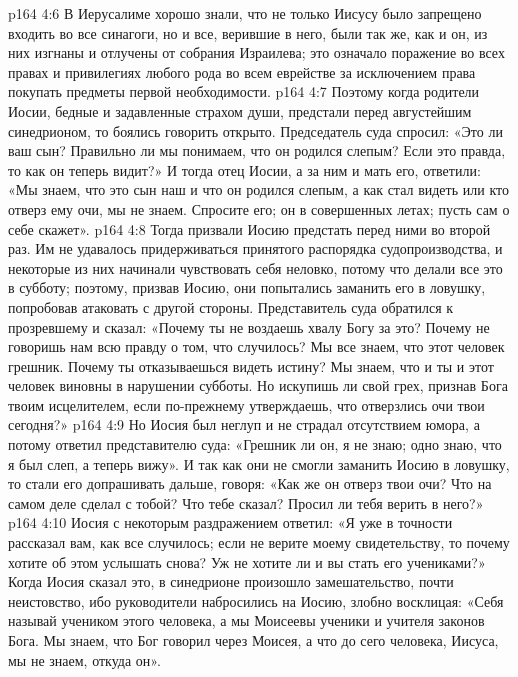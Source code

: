 \vs p164 4:6 В Иерусалиме хорошо знали, что не только Иисусу было запрещено входить во все синагоги, но и все, верившие в него, были так же, как и он, из них изгнаны и отлучены от собрания Израилева; это означало поражение во всех правах и привилегиях любого рода во всем еврействе за исключением права покупать предметы первой необходимости.
\vs p164 4:7 Поэтому когда родители Иосии, бедные и задавленные страхом души, предстали перед августейшим синедрионом, то боялись говорить открыто. Председатель суда спросил: «Это ли ваш сын? Правильно ли мы понимаем, что он родился слепым? Если это правда, то как он теперь видит?» И тогда отец Иосии, а за ним и мать его, ответили: «Мы знаем, что это сын наш и что он родился слепым, а как стал видеть или кто отверз ему очи, мы не знаем. Спросите его; он в совершенных летах; пусть сам о себе скажет».
\vs p164 4:8 Тогда призвали Иосию предстать перед ними во второй раз. Им не удавалось придерживаться принятого распорядка судопроизводства, и некоторые из них начинали чувствовать себя неловко, потому что делали все это в субботу; поэтому, призвав Иосию, они попытались заманить его в ловушку, попробовав атаковать с другой стороны. Представитель суда обратился к прозревшему и сказал: «Почему ты не воздаешь хвалу Богу за это? Почему не говоришь нам всю правду о том, что случилось? Мы все знаем, что этот человек грешник. Почему ты отказываешься видеть истину? Мы знаем, что и ты и этот человек виновны в нарушении субботы. Но искупишь ли свой грех, признав Бога твоим исцелителем, если по\hyp{}прежнему утверждаешь, что отверзлись очи твои сегодня?»
\vs p164 4:9 Но Иосия был неглуп и не страдал отсутствием юмора, а потому ответил представителю суда: «Грешник ли он, я не знаю; одно знаю, что я был слеп, а теперь вижу». И так как они не смогли заманить Иосию в ловушку, то стали его допрашивать дальше, говоря: «Как же он отверз твои очи? Что на самом деле сделал с тобой? Что тебе сказал? Просил ли тебя верить в него?»
\vs p164 4:10 Иосия с некоторым раздражением ответил: «Я уже в точности рассказал вам, как все случилось; если не верите моему свидетельству, то почему хотите об этом услышать снова? Уж не хотите ли и вы стать его учениками?» Когда Иосия сказал это, в синедрионе произошло замешательство, почти неистовство, ибо руководители набросились на Иосию, злобно восклицая: «Себя называй учеником этого человека, а мы Моисеевы ученики и учителя законов Бога. Мы знаем, что Бог говорил через Моисея, а что до сего человека, Иисуса, мы не знаем, откуда он».
